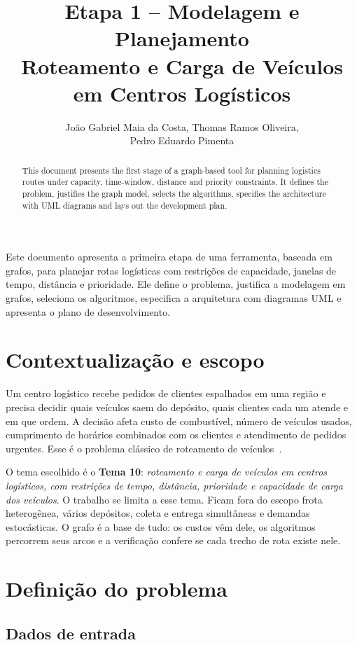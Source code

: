 \documentclass[12pt]{article}
\title{Etapa 1 -- Modelagem e Planejamento\\ Roteamento e Carga de Veículos em Centros Logísticos}
\author{João Gabriel Maia da Costa\inst{1}, Thomas Ramos Oliveira\inst{1},\\ Pedro Eduardo Pimenta\inst{1}}
\begin{document}
\maketitle

\begin{abstract}
This document presents the first stage of a graph-based tool for planning logistics routes under capacity, time-window, distance and priority constraints. It defines the problem, justifies the graph model, selects the algorithms, specifies the architecture with UML diagrams and lays out the development plan.
\end{abstract}

\begin{resumo}
Este documento apresenta a primeira etapa de uma ferramenta, baseada em grafos, para planejar rotas logísticas com restrições de capacidade, janelas de tempo, distância e prioridade. Ele define o problema, justifica a modelagem em grafos, seleciona os algoritmos, especifica a arquitetura com diagramas UML e apresenta o plano de desenvolvimento.
\end{resumo}

\section{Contextualização e escopo}

Um centro logístico recebe pedidos de clientes espalhados em uma região e precisa decidir quais veículos saem do depósito, quais clientes cada um atende e em que ordem. A decisão afeta custo de combustível, número de veículos usados, cumprimento de horários combinados com os clientes e atendimento de pedidos urgentes. Esse é o problema clássico de roteamento de veículos~\cite{dantzig1959,tothvigo2014}.

O tema escolhido é o \textbf{Tema 10}: \emph{roteamento e carga de veículos em centros logísticos, com restrições de tempo, distância, prioridade e capacidade de carga dos veículos}. O trabalho se limita a esse tema. Ficam fora do escopo frota heterogênea, vários depósitos, coleta e entrega simultâneas e demandas estocásticas. O grafo é a base de tudo: os custos vêm dele, os algoritmos percorrem seus arcos e a verificação confere se cada trecho de rota existe nele.

\section{Definição do problema}

\subsection{Dados de entrada}
\end{document}
